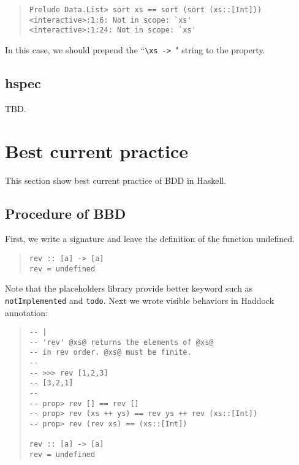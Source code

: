 \documentclass[preprint]{sigplanconf}
\begin{document}
\begin{quote}
\small
\begin{verbatim}
Prelude Data.List> sort xs == sort (sort (xs::[Int]))
<interactive>:1:6: Not in scope: `xs'
<interactive>:1:24: Not in scope: `xs'
\end{verbatim}
\end{quote}

\noindent In this case, we should prepend the ``\verb|\xs -> |" string
to the property.

\subsection{hspec}
\label{sec:hspec}

TBD.

\section{Best current practice}
\label{ref:Best-current-practice}

This section show best current practice of
BDD in Haskell.

\subsection{Procedure of BBD}

First, we write a signature and leave the definition of the function undefined.

\begin{quote}
\small
\begin{verbatim}
rev :: [a] -> [a]
rev = undefined
\end{verbatim}
\end{quote}

\noindent Note that the placeholders library provide better keyword such as {\tt notImplemented} and {\tt todo}.
Next we wrote visible behaviors in Haddock annotation:

\begin{quote}
\small
\begin{verbatim}
-- |
-- 'rev' @xs@ returns the elements of @xs@
-- in rev order. @xs@ must be finite.
--
-- >>> rev [1,2,3]
-- [3,2,1]
--
-- prop> rev [] == rev []
-- prop> rev (xs ++ ys) == rev ys ++ rev (xs::[Int])
-- prop> rev (rev xs) == (xs::[Int])

rev :: [a] -> [a]
rev = undefined
\end{verbatim}
\end{quote}
\end{document}

